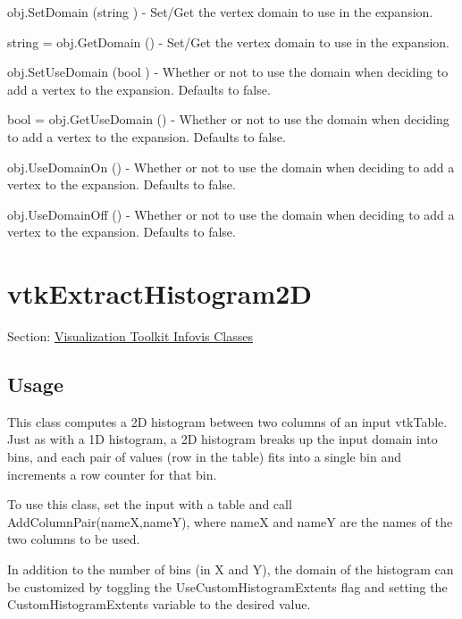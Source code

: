 \begin{DoxyItemize}
\item {\ttfamily obj.\-Set\-Domain (string )} -\/ Set/\-Get the vertex domain to use in the expansion.  
\item {\ttfamily string = obj.\-Get\-Domain ()} -\/ Set/\-Get the vertex domain to use in the expansion.  
\item {\ttfamily obj.\-Set\-Use\-Domain (bool )} -\/ Whether or not to use the domain when deciding to add a vertex to the expansion. Defaults to false.  
\item {\ttfamily bool = obj.\-Get\-Use\-Domain ()} -\/ Whether or not to use the domain when deciding to add a vertex to the expansion. Defaults to false.  
\item {\ttfamily obj.\-Use\-Domain\-On ()} -\/ Whether or not to use the domain when deciding to add a vertex to the expansion. Defaults to false.  
\item {\ttfamily obj.\-Use\-Domain\-Off ()} -\/ Whether or not to use the domain when deciding to add a vertex to the expansion. Defaults to false.  
\end{DoxyItemize}\hypertarget{vtkinfovis_vtkextracthistogram2d}{}\section{vtk\-Extract\-Histogram2\-D}\label{vtkinfovis_vtkextracthistogram2d}
Section\-: \hyperlink{sec_vtkinfovis}{Visualization Toolkit Infovis Classes} \hypertarget{vtkwidgets_vtkxyplotwidget_Usage}{}\subsection{Usage}\label{vtkwidgets_vtkxyplotwidget_Usage}
This class computes a 2\-D histogram between two columns of an input vtk\-Table. Just as with a 1\-D histogram, a 2\-D histogram breaks up the input domain into bins, and each pair of values (row in the table) fits into a single bin and increments a row counter for that bin.

To use this class, set the input with a table and call Add\-Column\-Pair(name\-X,name\-Y), where name\-X and name\-Y are the names of the two columns to be used.

In addition to the number of bins (in X and Y), the domain of the histogram can be customized by toggling the Use\-Custom\-Histogram\-Extents flag and setting the Custom\-Histogram\-Extents variable to the desired value.


